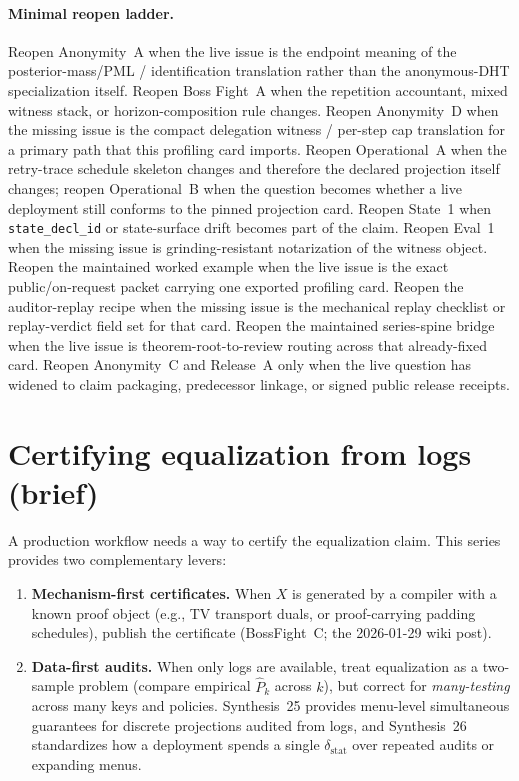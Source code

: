 \documentclass[11pt]{article}
\begin{document}
\paragraph{Minimal reopen ladder.}
Reopen Anonymity~A when the live issue is the endpoint meaning of the posterior-mass/PML / identification translation rather than the anonymous-DHT specialization itself. Reopen Boss Fight~A when the repetition accountant, mixed witness stack, or horizon-composition rule changes. Reopen Anonymity~D when the missing issue is the compact delegation witness / per-step cap translation for a primary path that this profiling card imports. Reopen Operational~A when the retry-trace schedule skeleton changes and therefore the declared projection itself changes; reopen Operational~B when the question becomes whether a live deployment still conforms to the pinned projection card. Reopen State~1 when \texttt{state\_decl\_id} or state-surface drift becomes part of the claim. Reopen Eval~1 when the missing issue is grinding-resistant notarization of the witness object. Reopen the maintained worked example when the live issue is the exact public/on-request packet carrying one exported profiling card. Reopen the auditor-replay recipe when the missing issue is the mechanical replay checklist or replay-verdict field set for that card. Reopen the maintained series-spine bridge when the live issue is theorem-root-to-review routing across that already-fixed card. Reopen Anonymity~C and Release~A only when the live question has widened to claim packaging, predecessor linkage, or signed public release receipts.\cite{series:oddsinflation,series:bossfightA,series:spectral2budget,series:operationalA,series:operationalB,series:state1,series:eval1,series:workedexample,series:replayrecipe,series:seriesspines,series:abomoinl,series:releaseA}

\section{Certifying equalization from logs (brief)}
A production workflow needs a way to certify the equalization claim.
This series provides two complementary levers:
\begin{enumerate}[leftmargin=*]
\item \textbf{Mechanism-first certificates.} When $X$ is generated by a compiler with a known proof object (e.g., TV transport duals, or proof-carrying padding schedules), publish the certificate (BossFight~C; the 2026-01-29 wiki post).
\item \textbf{Data-first audits.} When only logs are available, treat equalization as a two-sample problem (compare empirical $\widehat P_k$ across $k$), but correct for \emph{many-testing} across many keys and policies.
Synthesis~25 provides menu-level simultaneous guarantees for discrete projections audited from logs, and Synthesis~26 standardizes how a deployment spends a single $\delta_{\mathrm{stat}}$ over repeated audits or expanding menus.\cite{series:stataudit,series:anytimespend}
\end{enumerate}
\end{document}
